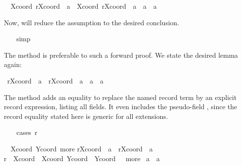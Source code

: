 \begin{isabellebody}
%
\begin{isamarkuptxt}%
\begin{isabelle}%
\ {}{\isachardot}\ Xcoord\ {\isacharparenleft}r{\isasymlparr}Xcoord\ {\isacharcolon}{\isacharequal}\ a{\isasymrparr}{\isacharparenright}\ {\isacharequal}\ Xcoord\ {\isacharparenleft}r{\isasymlparr}Xcoord\ {\isacharcolon}{\isacharequal}\ a{\isacharprime}{\isasymrparr}{\isacharparenright}\ {\isasymLongrightarrow}\ a\ {\isacharequal}\ a{\isacharprime}%
\end{isabelle}
    Now,  will reduce the assumption to the desired
    conclusion.%
\end{isamarkuptxt}%
\ \ \isamarkuptrue%
\ simp\isanewline
\ \ \isamarkupfalse%
\isamarkupfalse%
%
\begin{isamarkuptext}%
The  method is preferable to such a forward proof.  We
  state the desired lemma again:%
\end{isamarkuptext}%
\isamarkuptrue%
\ {\isachardoublequote}r{\isasymlparr}Xcoord\ {\isacharcolon}{\isacharequal}\ a{\isasymrparr}\ {\isacharequal}\ r{\isasymlparr}Xcoord\ {\isacharcolon}{\isacharequal}\ a{\isacharprime}{\isasymrparr}\ {\isasymLongrightarrow}\ a\ {\isacharequal}\ a{\isacharprime}{\isachardoublequote}\isamarkupfalse%
%
\begin{isamarkuptxt}%
The  method adds an equality to replace the
  named record term by an explicit record expression, listing all
  fields.  It even includes the pseudo-field , since the
  record equality stated here is generic for all extensions.%
\end{isamarkuptxt}%
\ \ \isamarkuptrue%
\ {\isacharparenleft}cases\ r{\isacharparenright}\isamarkupfalse%
%
\begin{isamarkuptxt}%
\begin{isabelle}%
\ {}{\isachardot}\ {\isasymAnd}Xcoord\ Ycoord\ more{\isachardot}\isanewline
{}r{\isasymlparr}Xcoord\ {\isacharcolon}{\isacharequal}\ a{\isasymrparr}\ {\isacharequal}\ r{\isasymlparr}Xcoord\ {\isacharcolon}{\isacharequal}\ a{\isacharprime}{\isasymrparr}{\isacharsemicolon}\isanewline
{}r\ {\isacharequal}\ {\isasymlparr}Xcoord\ {\isacharequal}\ Xcoord{\isacharcomma}\ Ycoord\ {\isacharequal}\ Ycoord{\isacharcomma}\ {\isasymdots}\ {\isacharequal}\ more{\isasymrparr}{\isasymrbrakk}\isanewline
{}\ a\ {\isacharequal}\ a{\isacharprime}%

\end{isabelle}
\end{isamarkuptxt}
\end{isabellebody}
